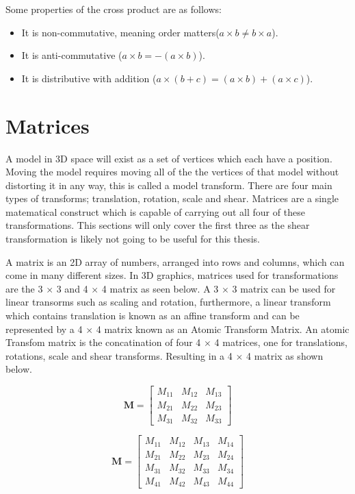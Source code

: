 \noindent
Some properties of the cross product are as follows:

\begin{itemize}
	\item It is non-commutative, meaning order matters($a \times b \not= b \times a$).
	\item It is anti-commutative ($a \times b = -(a \times b)$).
	\item It is distributive with addition ($a \times (b + c) = (a \times b) + (a \times c)$).
\end{itemize}

\section{Matrices}

A model in 3D space will exist as a set of vertices which each have a position. Moving the model requires moving all of the the vertices of that model without distorting it in any way, this is called a model transform. There are four main types of transforms; translation, rotation, scale and shear. Matrices are a single matematical construct which is capable of carrying out all four of these transformations. This sections will only cover the first three as the shear transformation is likely not going to be useful for this thesis.    

A matrix is an 2D array of numbers, arranged into rows and columns, which can come in many different sizes. In 3D graphics, matrices used for transformations are the 3 $\times$ 3 and 4 $\times$ 4 matrix as seen below. A 3 $\times$ 3 matrix can be used for linear transorms such as scaling and rotation, furthermore, a linear transform which contains translation is known as an affine transform and can be represented by a 4 $\times$ 4 matrix known as an Atomic Transform Matrix. An atomic Transfom matrix is the concatination of four 4 $\times$ 4 matrices, one for translations, rotations, scale and shear transforms. Resulting in a 4 $\times$ 4 matrix as shown below. 

\begin{equation}
\textbf{M} = \begin{bmatrix}
M_{11} & M_{12} & M_{13} \\
M_{21} & M_{22} & M_{23} \\
M_{31} & M_{32} & M_{33}
\end{bmatrix}
\end{equation}

\begin{equation}
\textbf{M} = \begin{bmatrix}
M_{11} & M_{12} & M_{13} & M_{14}\\
M_{21} & M_{22} & M_{23} & M_{24}\\
M_{31} & M_{32} & M_{33} & M_{34}\\
M_{41} & M_{42} & M_{43} & M_{44}
\end{bmatrix}
\end{equation}

